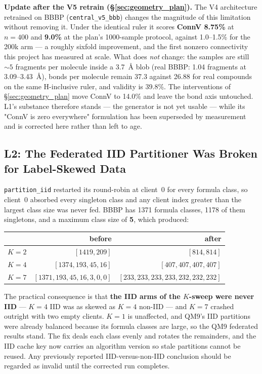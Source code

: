 \documentclass[12pt, a4paper]{article}
\begin{document}
\textbf{Update after the V5 retrain (\S\ref{sec:geometry_plan}).} The V4
architecture retrained on BBBP (\texttt{central\_v5\_bbb}) changes the
magnitude of this limitation without removing it. Under the identical ruler it
scores \textbf{ConnV 8.75\%} at $n{=}400$ and \textbf{9.0\%} at the plan's
1000-sample protocol, against 1.0--1.5\% for the 200k arm --- a roughly sixfold
improvement, and the first nonzero connectivity this project has measured at
scale. What does \emph{not} change: the samples are still ${\sim}5$ fragments
per molecule inside a 3.7~\AA{} blob (real BBBP: 1.04 fragments at
3.09--3.43~\AA{}), bonds per molecule remain 37.3 against 26.88 for real
compounds on the same H-inclusive ruler, and validity is 39.8\%. The
interventions of \S\ref{sec:geometry_plan} move ConnV to 14.0\% and leave the
bond axis untouched. L1's substance therefore stands --- the generator is not
yet usable --- while its "ConnV is zero everywhere" formulation has been
superseded by measurement and is corrected here rather than left to age.

\subsection{L2: The Federated IID Partitioner Was Broken for Label-Skewed Data}

\texttt{partition\_iid} restarted its round-robin at client~0 for every formula
class, so client~0 absorbed every singleton class and any client index greater
than the largest class size was never fed. BBBP has 1371 formula classes, 1178
of them singletons, and a maximum class size of \textbf{5}, which produced:

\begin{center}
\begin{tabular}{lrr}
\toprule
 & before & after \\
\midrule
$K=2$ & $[1419, 209]$ & $[814, 814]$ \\
$K=4$ & $[1374, 193, 45, 16]$ & $[407, 407, 407, 407]$ \\
$K=7$ & $[1371, 193, 45, 16, 3, 0, 0]$ & $[233, 233, 233, 233, 232, 232, 232]$ \\
\bottomrule
\end{tabular}
\end{center}

The practical consequence is that \textbf{the IID arms of the $K$-sweep were
never IID} --- $K=4$ IID was as skewed as $K=4$ non-IID --- and $K=7$ crashed
outright with two empty clients. $K=1$ is unaffected, and QM9's IID partitions
were already balanced because its formula classes are large, so the QM9
federated results stand. The fix deals each class evenly and rotates the
remainders, and the IID cache key now carries an algorithm version so stale
partitions cannot be reused. Any previously reported IID-versus-non-IID
conclusion should be regarded as invalid until the corrected run completes.
\end{document}
